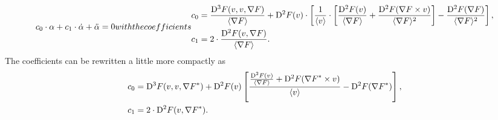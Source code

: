 \begin{subequations}
    \begin{align}
        c_0 \mult \alpha  +
        c_1 \mult \dot{ \alpha }  +
        \ddot{ \alpha }
        =
        0
    \end{align}
    with the coefficients
    \begin{align}
        c_0
        &=
        \frac{ \diff{3}{F}( v, v, \grad{F} ) }{ \skaq{\grad{F}} }  +
        \diff{2}{F}( v ) \mult
        \left[ \frac{ 1 }{ \skaq{v} } \mult
        \left[ \frac{ \diff{2}{F}( v ) }{ \skaq{\grad{F}} }  +
        \frac{ \diff{2}{F}( \grad{F} \times v ) }{ \skaq{\grad{F}}^2 } \right]
        -  \frac{ \diff{2}{F}( \grad{F} ) }{ \skaq{\grad{F}}^2 } \right] ,
        \\
        c_1
        &=
        2 \mult \frac{ \diff{2}{F}( v, \grad{F} ) }{ \skaq{\grad{F}} } .
    \end{align}
\end{subequations}
The coefficients can be rewritten a little more compactly as
\begin{subequations}
    \begin{align}
        c_0   &=
        \mathrm{D}^{ 3 }F( v, v, {\nabla F}^* )  +
        \mathrm{D}^{ 2 }F( v )
        \left[ \frac{ \frac{ \mathrm{D}^{ 2 }F( v ) }{ \langle \nabla F \rangle }  +
        \mathrm{D}^{ 2 }F( {\nabla F}^* \times v ) }{ \langle v \rangle }  -
        \mathrm{D}^{ 2 }F( {\nabla F}^* ) \right] ,
        \\
        c_1   &=   2 \cdot \mathrm{D}^{ 2 }F( v, {\nabla F}^* ) .
    \end{align}
\end{subequations}



